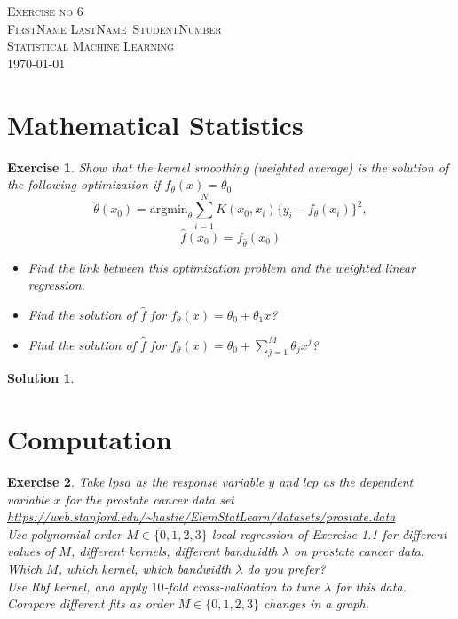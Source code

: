 \documentclass[12pt,a4paper]{article}
\def\StudentName{FirstName LastName}
\def\StudentMatricule{StudentNumber}
\def\ExerciseNo{6}
\newtheorem{exercise}{Exercise}
\numberwithin{exercise}{section} %
\newtheorem{solution}{Solution}
\numberwithin{solution}{section} %
\begin{document}
\begin{titlepage}
\begin{center}
\textsc{\LARGE Exercise no \ExerciseNo}\\[1.5cm]
\vspace{2in}
\textsc{\Large \StudentName~\StudentMatricule}\\[0.5cm]
\textsc{Statistical Machine Learning}\\[0.5cm]
\today
\end{center}
\end{titlepage}



\section{Mathematical Statistics}
\begin{exercise}
Show that the kernel smoothing (weighted average)  is the solution of the following optimization if $f_\theta(x)=\theta_0$
 $$\hat \theta(x_0)= \mathrm{argmin}_\theta \sum_{i=1}^N K(x_0,x_i) \{y_i-f_\theta(x_i)\}^2,$$
 $$ \hat f(x_0)= f_{\hat \theta} (x_0)$$
\begin{itemize}
\item Find the link between this optimization problem and the  weighted linear regression. 
\item Find the solution of $\hat f$ for $f_\theta(x)=\theta_0+\theta_1 x$?
\item Find the solution of $\hat f$ for $f_\theta(x)=\theta_0+\sum_{j=1}^M \theta_j x^j$?
\end{itemize}
\end{exercise}
\begin{solution}
\end{solution}

\newpage

\section{Computation}
\begin{exercise}
Take $lpsa$ as the response variable $y$ and $lcp$ as the dependent variable $x$ for the prostate cancer data set\\
\url{https://web.stanford.edu/~hastie/ElemStatLearn/datasets/prostate.data}\\
Use polynomial order $M\in\{0,1,2,3\}$ local regression of Exercise 1.1  for different values of $M$, different kernels, different bandwidth $\lambda$ on prostate cancer data. Which $M$, which kernel, which bandwidth $\lambda$ do you prefer?\\
Use Rbf kernel, and apply $10$-fold cross-validation to tune $\lambda$  for this data. 
Compare different fits as order $M\in\{0,1,2,3\}$ changes in a graph.
\end{exercise}
\end{document}
